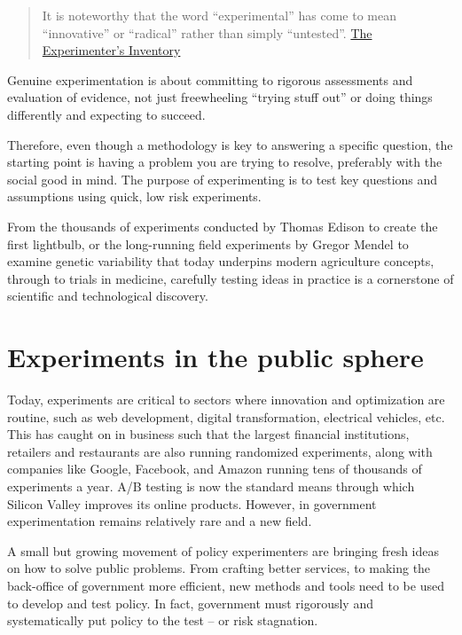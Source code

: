 \documentclass[]{book}
\begin{document}
\begin{quote}
It is noteworthy that the word ``experimental'' has come to mean ``innovative'' or ``radical'' rather than simply ``untested''. \href{A\%20catalogue\%20of\%20experiments\%20for\%20decision-makers\%20and\%20professionals}{The Experimenter's Inventory}
\end{quote}

Genuine experimentation is about committing to rigorous assessments and evaluation of evidence, not just freewheeling ``trying stuff out'' or doing things differently and expecting to succeed.

Therefore, even though a methodology is key to answering a specific question, the starting point is having a problem you are trying to resolve, preferably with the social good in mind. The purpose of experimenting is to test key questions and assumptions using quick, low risk experiments.

From the thousands of experiments conducted by Thomas Edison to create the first lightbulb, or the long-running field experiments by Gregor Mendel to examine genetic variability that today underpins modern agriculture concepts, through to trials in medicine, carefully testing ideas in practice is a cornerstone of scientific and technological discovery.

\hypertarget{experiments-in-the-public-sphere}{%
\section{Experiments in the public sphere}\label{experiments-in-the-public-sphere}}

Today, experiments are critical to sectors where innovation and optimization are routine, such as web development, digital transformation, electrical vehicles, etc. This has caught on in business such that the largest financial institutions, retailers and restaurants are also running randomized experiments, along with companies like Google, Facebook, and Amazon running tens of thousands of experiments a year. A/B testing is now the standard means through which Silicon Valley improves its online products. However, in government experimentation remains relatively rare and a new field.

A small but growing movement of policy experimenters are bringing fresh ideas on how to solve public problems. From crafting better services, to making the back-office of government more efficient, new methods and tools need to be used to develop and test policy. In fact, government must rigorously and systematically put policy to the test -- or risk stagnation.
\end{document}
